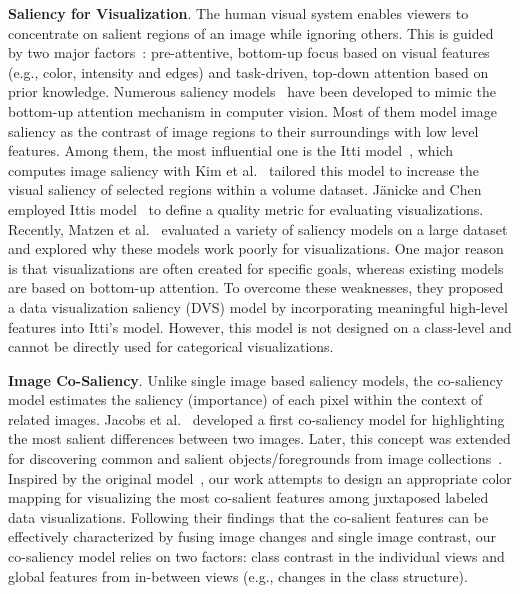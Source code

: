 \vspace{1.5mm}
\noindent\textbf{Saliency for Visualization}.
The human visual system enables viewers to concentrate on salient regions of an image while ignoring others. This is guided by two major factors~\cite{connor2004visual}: pre-attentive, bottom-up focus based on visual features (e.g., color, intensity and edges) and task-driven, top-down attention based on prior knowledge. %
Numerous saliency models~\cite{borji2019salient} have been developed to mimic the bottom-up attention mechanism in computer vision.
Most of them model image saliency as the contrast of image regions to their surroundings with low level features. Among them, the most influential one is the Itti model~\cite{Itti98}, which computes image saliency with
Kim et al.~\cite{Kim06} tailored this model to increase the visual saliency of selected regions within a volume dataset.
Jänicke and Chen~\cite{Janicke10} employed Ittis model~\cite{Itti98} to define a quality metric for evaluating visualizations.
Recently, Matzen et al.~\cite{Matzen18} evaluated a variety of saliency models on a large dataset and explored why these models work poorly for visualizations. One major reason is that visualizations are often created for specific goals, whereas existing models are based on  bottom-up attention. To overcome these weaknesses, they proposed a data visualization saliency (DVS) model by incorporating meaningful high-level features into Itti's model. However, this model is not designed on a class-level and cannot be directly used for categorical visualizations.

\vspace{1.5mm}
\noindent\textbf{Image Co-Saliency}.
Unlike single image based saliency models, the co-saliency model estimates the saliency (importance) of each pixel within the context of related images. Jacobs et al.~\cite{Jacobs10} developed a first co-saliency model for highlighting the most salient differences between two  images.  Later, this concept was extended for discovering common and salient objects/foregrounds from image collections~\cite{zhang2018review}. Inspired by the original model~\cite{Jacobs10}, our work attempts to design an appropriate color mapping for visualizing the most co-salient features among juxtaposed labeled data visualizations. Following their findings that the co-salient features can be effectively characterized by fusing image changes and single image contrast, our co-saliency model relies on two factors: class contrast in the individual views  and global features from in-between views (e.g., changes in the class structure).
